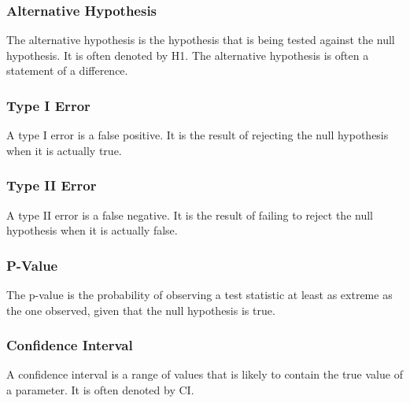 \documentclass[11pt]{article}
\begin{document}
\subsubsection{Alternative Hypothesis}
\label{sec:org80ef8ef}
The alternative hypothesis is the hypothesis that is being tested against the null hypothesis. It is often denoted by H1. The alternative hypothesis is often a statement of a difference.

\subsubsection{Type I Error}
\label{sec:orgb13d635}
A type I error is a false positive. It is the result of rejecting the null hypothesis when it is actually true.

\subsubsection{Type II Error}
\label{sec:orge78438d}
A type II error is a false negative. It is the result of failing to reject the null hypothesis when it is actually false.

\subsubsection{P-Value}
\label{sec:org870efde}
The p-value is the probability of observing a test statistic at least as extreme as the one observed, given that the null hypothesis is true.

\subsubsection{Confidence Interval}
\label{sec:org1e83000}
A confidence interval is a range of values that is likely to contain the true value of a parameter. It is often denoted by CI.
\end{document}
